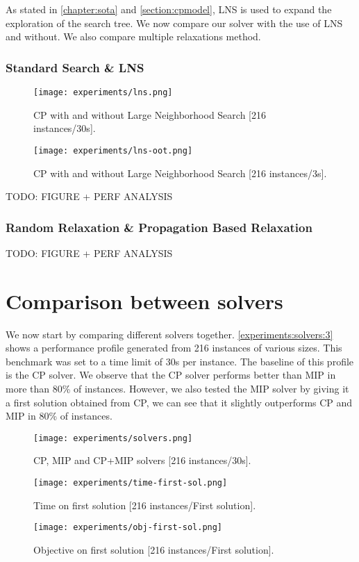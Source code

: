 \documentclass[../../thesis.tex]{subfiles}
\begin{document}
As stated in \autoref{chapter:sota} and \autoref{section:cpmodel}, LNS is used to expand the exploration
of the search tree. We now compare our solver with the use of LNS and without. We also compare multiple 
relaxations method.


\subsubsection{Standard Search \& LNS}


\begin{figure}
  \centering
  \texttt{[image: experiments/lns.png]}
  \caption{CP with and without Large Neighborhood Search [216 instances/30s].}
  \label{experiments:lns}
\end{figure}

\begin{figure}
  \centering
  \texttt{[image: experiments/lns-oot.png]}
  \caption{CP with and without Large Neighborhood Search [216 instances/3s].}
  \label{experiments:lns-oot}
\end{figure}


TODO: FIGURE + PERF ANALYSIS


\subsubsection{Random Relaxation \& Propagation Based Relaxation}

TODO: FIGURE + PERF ANALYSIS

\section{Comparison between solvers}

We now start by comparing different solvers together. \autoref{experiments:solvers:3} 
shows a performance profile generated from 216 instances of various sizes.
This benchmark was set to a time limit of 30s per instance. The baseline of this 
profile is the CP solver. We observe that the CP solver performs better than MIP in more than 80\% of instances.
However, we also tested the MIP solver by giving it a first solution obtained from CP, we can see that it slightly outperforms CP and MIP in 80\% of instances.

\begin{figure}
  \centering
  \texttt{[image: experiments/solvers.png]}
  \caption{CP, MIP and CP+MIP solvers [216 instances/30s].}
  \label{experiments:solvers:3}
\end{figure}


\begin{figure}
  \centering
  \texttt{[image: experiments/time-first-sol.png]}
  \caption{Time on first solution [216 instances/First solution].}
  \label{experiments:first-sol-time}
\end{figure}


\begin{figure}
  \centering
  \texttt{[image: experiments/obj-first-sol.png]}
  \caption{Objective on first solution [216 instances/First solution].}
  \label{experiments:first-sol-obj}
\end{figure}
\end{document}
